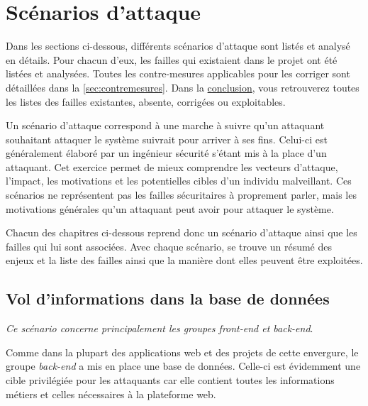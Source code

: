\section{Scénarios d'attaque}
\label{sec:scenarios}

Dans les sections ci-dessous, différents scénarios d'attaque sont listés et analysé en détails. Pour chacun d'eux, les failles qui existaient dans le projet ont été listées et analysées. Toutes les contre-mesures applicables pour les corriger sont détaillées dans la \autoref{sec:contremesures}. Dans la \hyperref[sec:conclusion]{conclusion}, vous retrouverez toutes les listes des failles existantes, absente, corrigées ou exploitables.

Un scénario d'attaque correspond à une marche à suivre qu'un attaquant souhaitant attaquer le système suivrait pour arriver à ses fins. Celui-ci est généralement élaboré par un ingénieur sécurité s'étant mis à la place d'un attaquant. Cet exercice permet de mieux comprendre les vecteurs d'attaque, l'impact, les motivations et les potentielles cibles d'un individu malveillant. Ces scénarios ne représentent pas les failles sécuritaires à proprement parler, mais les motivations générales qu'un attaquant peut avoir pour attaquer le système.

Chacun des chapitres ci-dessous reprend donc un scénario d'attaque ainsi que les failles qui lui sont associées. Avec chaque scénario, se trouve un résumé des enjeux et la liste des failles ainsi que la manière dont elles peuvent être exploitées.

\subsection{Vol d'informations dans la base de données}

\emph{Ce scénario concerne principalement les groupes front-end et back-end}.
\medskip

Comme dans la plupart des applications web et des projets de cette envergure, le groupe \emph{back-end} a mis en place une base de données. Celle-ci est évidemment une cible privilégiée pour les attaquants car elle contient toutes les informations métiers et celles nécessaires à la plateforme web.
\medskip

